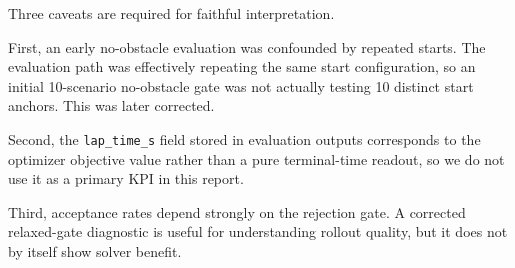 Three caveats are required for faithful interpretation.

First, an early no-obstacle evaluation was confounded by repeated starts. The evaluation path was effectively repeating the same start configuration, so an initial 10-scenario no-obstacle gate was not actually testing 10 distinct start anchors. This was later corrected.

Second, the \texttt{lap\_time\_s} field stored in evaluation outputs corresponds to the optimizer objective value rather than a pure terminal-time readout, so we do not use it as a primary KPI in this report.

Third, acceptance rates depend strongly on the rejection gate. A corrected relaxed-gate diagnostic is useful for understanding rollout quality, but it does not by itself show solver benefit.
